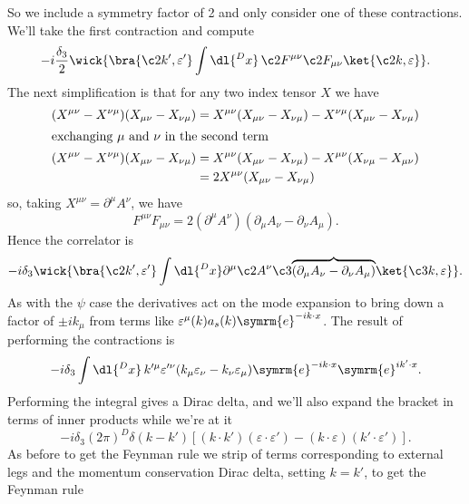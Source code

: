 \documentclass[fleqn]{NotesClass}
\newcommand{\e}{\symrm{e}}
\begin{document}
    So we include a symmetry factor of 2 and only consider one of these contractions.
    We'll take the first contraction and compute
    \begin{equation}
        -i \frac{\delta_3}{2} \wick{\bra{\c2{k}', \varepsilon'} \int \dl{^Dx} \, \c2{F}^{\mu\nu} \c2{F}_{\mu\nu} \ket{\c2{k}, \varepsilon}}.
    \end{equation}
    The next simplification is that for any two index tensor \(X\) we have
    \begin{align}
        (X^{\mu\nu} - X^{\nu\mu})(X_{\mu\nu} - X_{\nu\mu}) &= X^{\mu\nu}(X_{\mu\nu} - X_{\nu\mu}) - X^{\nu\mu}(X_{\mu\nu} - X_{\nu\mu})\\
        \shortintertext{exchanging \(\mu\) and \(\nu\) in the second term}
        (X^{\mu\nu} - X^{\nu\mu})(X_{\mu\nu} - X_{\nu\mu}) &= X^{\mu\nu}(X_{\mu\nu} - X_{\nu\mu}) - X^{\mu\nu}(X_{\nu\mu} - X_{\mu\nu})\\
        &= 2X^{\mu\nu}(X_{\mu\nu} - X_{\nu\mu})
    \end{align}
    so, taking \(X^{\mu\nu} = \partial^\mu A^\nu\), we have
    \begin{equation}
        F^{\mu\nu}F_{\mu\nu} = 2(\partial^\mu A^\nu)(\partial_\mu A_\nu - \partial_\nu A_\mu).
    \end{equation}
    Hence the correlator is
    \begin{equation}
        -i \delta_3 \wick{\bra{\c2{k}', \varepsilon'} \int \dl{^Dx} \partial^\mu \c2{A}^\nu\c3{\overbrace{(\partial_\mu A_\nu - \partial_\nu A_\mu)}} \ket{\c3{k}, \varepsilon}}.
    \end{equation}
    As with the \(\psi\) case the derivatives act on the mode expansion to bring down a factor of \(\pm ik_\mu\) from terms like \(\varepsilon^\mu(k)a_s(k)\e^{-ik\cdot x}\).
    The result of performing the contractions is
    \begin{equation}
        -i\delta_3 \int \dl{^Dx} \, k'^\mu \varepsilon'^\nu (k_\mu \varepsilon_\nu - k_\nu \varepsilon_\mu) \e^{-ik\cdot x} \e^{ik' \cdot x}.
    \end{equation}
    Performing the integral gives a Dirac delta, and we'll also expand the bracket in terms of inner products while we're at it
    \begin{equation}
        -i\delta_3(2\pi)^D\delta(k - k')[(k \cdot k')(\varepsilon \cdot \varepsilon') - (k \cdot \varepsilon)(k' \cdot \varepsilon')].
    \end{equation}
    As before to get the Feynman rule we strip of terms corresponding to external legs and the momentum conservation Dirac delta, setting \(k = k'\), to get the Feynman rule
\end{document}
